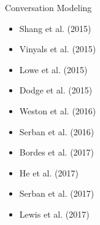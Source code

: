 \begin{frame}
\begin{columns}
\begin{column}{0.4\textwidth}
\begin{overlayarea}{\textwidth}{\textheight}
              \begin{block}{Conversation Modeling}
                \begin{itemize}
                  \item Shang et al. (2015) \cite{DBLP:conf/acl/ShangLL15}
                  \item Vinyals et al. (2015) \cite{DBLP:journals/corr/VinyalsL15}
                  \item Lowe et al. (2015) \cite{DBLP:conf/sigdial/LowePSP15}
                  \item Dodge et al. (2015) \cite{DBLP:journals/corr/DodgeGZBCMSW15}
                  \item Weston et al. (2016) \cite{DBLP:journals/corr/WestonBCM15}
                  \item Serban et al. (2016) \cite{DBLP:journals/corr/SerbanSLCPCB16}
                  \item Bordes et al. (2017) \cite{DBLP:journals/corr/BordesW16}
                  \item He et al. (2017)
                  \item Serban et al. (2017) \cite{DBLP:journals/corr/abs-1709-02349}
                  \item Lewis et al. (2017) 
                \end{itemize}
              \end{block}
\end{overlayarea}
\end{column}

\end{columns}
\end{frame}

